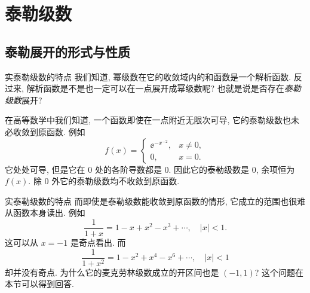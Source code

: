 \section{泰勒级数}

\subsection{泰勒展开的形式与性质}

\begin{frame}{实泰勒级数的特点}
	\onslide<+->
	我们知道, 幂级数在它的收敛域内的和函数是一个解析函数.
	\onslide<+->
	反过来, 解析函数是不是也一定可以在一点展开成幂级数呢? 也就是说是否存在\emph{泰勒级数}展开?

	\onslide<+->
	在高等数学中我们知道, 一个函数即使在一点附近无限次可导, 它的泰勒级数也未必收敛到原函数.
	\onslide<+->
	例如
	\[f(x)=\begin{cases}
	\ee^{-x^{-2}},&x\neq 0,\\
	0,&x=0.\end{cases}
	\]
	\onslide<+->
	它处处可导, 但是它在 $0$ 处的各阶导数都是 $0$.
	\onslide<+->
	因此它的泰勒级数是 $0$, 余项恒为 $f(x)$.
	\onslide<+->
	除 $0$ 外它的泰勒级数均不收敛到原函数.
\end{frame}


\begin{frame}{实泰勒级数的特点}
	\onslide<+->
	而即使是泰勒级数能收敛到原函数的情形, 它成立的范围也很难从函数本身读出.
	\onslide<+->
	例如
	\[\dfrac1{1+x}=1-x+x^2-x^3+\cdots,\quad|x|<1.
	\]
	\onslide<+->
	这可以从 $x=-1$ 是奇点看出.
	\onslide<+->
	而
	\[\dfrac1{1+x^2}=1-x^2+x^4-x^6+\cdots,\quad|x|<1
	\]
	却并没有奇点.
	\onslide<+->
	为什么它的麦克劳林级数成立的开区间也是 $(-1,1)$?
	\onslide<+->
	这个问题在本节可以得到回答.
\end{frame}


